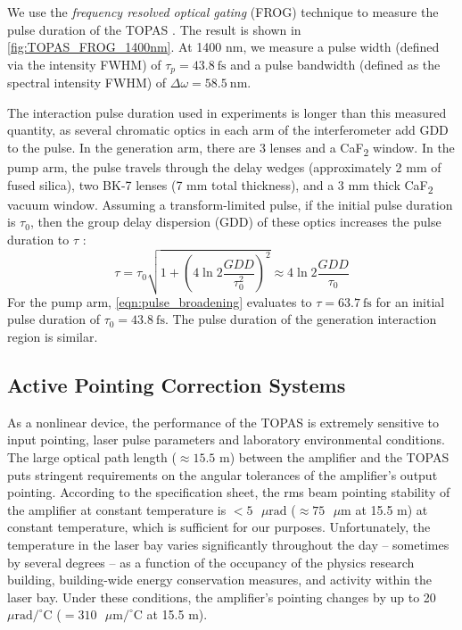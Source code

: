 We use the \textit{frequency resolved optical gating} (FROG) technique to measure the pulse duration of the TOPAS \cite{kaneCharacterizationArbitraryFemtosecond1993}. The result is shown in \cref{fig:TOPAS_FROG_1400nm}. At 1400 nm, we measure a pulse width (defined via the intensity FWHM) of $\tau_p = 43.8 \ \textrm{fs}$ and a pulse bandwidth (defined as the spectral intensity FWHM) of $\Delta \omega = 58.5 \ \textrm{nm}$.

The interaction pulse duration used in experiments is longer than this measured quantity, as several chromatic optics in each arm of the interferometer add GDD to the pulse. In the generation arm, there are 3 lenses and a CaF\textsubscript{2} window. In the pump arm, the pulse travels through the delay wedges (approximately 2 mm of fused silica), two BK-7 lenses (7 mm total thickness), and a 3 mm thick CaF\textsubscript{2} vacuum window. Assuming a transform-limited pulse, if the initial pulse duration is $\tau_0$, then the group delay dispersion (GDD) of these optics increases the pulse duration to $\tau$ \cite{dielsUltrashortLaserPulse2006}:
\begin{equation}
\tau = \tau_0 \sqrt{1 + \left(4 \ln 2 \frac{GDD}{\tau_0^2}\right)^2} \approx 4 \ln 2 \frac{GDD}{\tau_0}
\label{eqn:pulse_broadening}
\end{equation}
For the pump arm, \cref{eqn:pulse_broadening} evaluates to $\tau = 63.7 \ \textrm{fs}$ for an initial pulse duration of $\tau_0 = 43.8 \ \textrm{fs}$. The pulse duration of the generation interaction region is similar.

\subsection{Active Pointing Correction Systems}

As a nonlinear device, the performance of the TOPAS is extremely sensitive to input pointing, laser pulse parameters and laboratory environmental conditions. The large optical path length ($\approx 15.5$ m) between the amplifier and the TOPAS puts stringent requirements on the angular tolerances of the amplifier's output pointing. According to the specification sheet, the rms beam pointing stability of the amplifier at constant temperature is $<5\text{ } \mu \text{rad}$ ($\approx 75 \text{ } \mu \text{m}$ at 15.5 m) at constant temperature, which is sufficient for our purposes. Unfortunately, the temperature in the laser bay varies significantly throughout the day -- sometimes by several degrees -- as a function of the occupancy of the physics research building, building-wide energy conservation measures, and activity within the laser bay. Under these conditions, the amplifier's pointing changes by up to 20 $\mu \text{rad} / ^{\circ} \text{C}$ ($= 310 \text{ } \mu \text{m}/ ^{\circ} \text{C}$ at 15.5 m).

